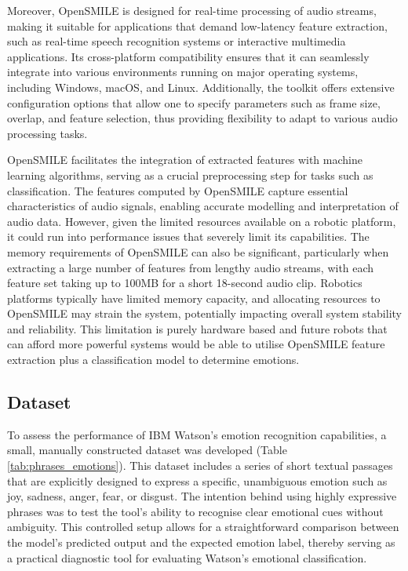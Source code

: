 Moreover, OpenSMILE is designed for real-time processing of audio streams, making it suitable for applications that demand low-latency feature extraction, such as real-time speech recognition systems or interactive multimedia applications. Its cross-platform compatibility ensures that it can seamlessly integrate into various environments running on major operating systems, including Windows, macOS, and Linux. Additionally, the toolkit offers extensive configuration options that allow one to specify parameters such as frame size, overlap, and feature selection, thus providing flexibility to adapt to various audio processing tasks.

OpenSMILE facilitates the integration of extracted features with machine learning algorithms, serving as a crucial preprocessing step for tasks such as classification. The features computed by OpenSMILE capture essential characteristics of audio signals, enabling accurate modelling and interpretation of audio data. However, given the limited resources available on a robotic platform, it could run into performance issues that severely limit its capabilities. The memory requirements of OpenSMILE can also be significant, particularly when extracting a large number of features from lengthy audio streams, with each feature set taking up to 100MB for a short 18-second audio clip. Robotics platforms typically have limited memory capacity, and allocating resources to OpenSMILE may strain the system, potentially impacting overall system stability and reliability. This limitation is purely hardware based and future robots that can afford more powerful systems would be able to utilise OpenSMILE feature extraction plus a classification model to determine emotions.

\subsection{Dataset}

To assess the performance of IBM Watson's emotion recognition capabilities, a small, manually constructed dataset was developed (Table \ref{tab:phrases_emotions}). This dataset includes a series of short textual passages that are explicitly designed to express a specific, unambiguous emotion such as joy, sadness, anger, fear, or disgust. The intention behind using highly expressive phrases was to test the tool's ability to recognise clear emotional cues without ambiguity. This controlled setup allows for a straightforward comparison between the model's predicted output and the expected emotion label, thereby serving as a practical diagnostic tool for evaluating Watson's emotional classification.


